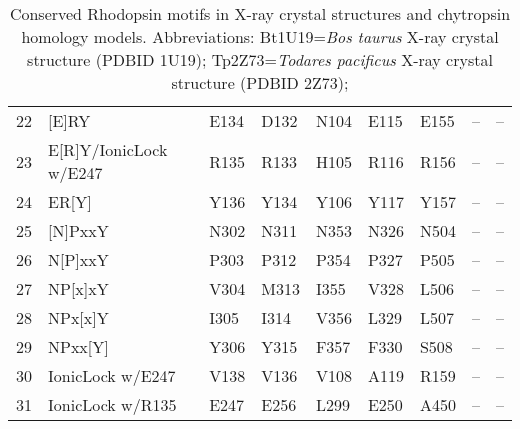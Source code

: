 \begin{table}[tbp]
\begin{tabular}{rllllllll}
   \hline
22 & [E]RY & E134 & D132 & N104 & E115 & E155 & -- & -- \\ 
  23 & E[R]Y/IonicLock w/E247 & R135 & R133 & H105 & R116 & R156 & -- & -- \\ 
  24 & ER[Y] & Y136 & Y134 & Y106 & Y117 & Y157 & -- & -- \\ 
   \hline
25 & [N]PxxY & N302 & N311 & N353 & N326 & N504 & -- & -- \\ 
  26 & N[P]xxY & P303 & P312 & P354 & P327 & P505 & -- & -- \\ 
  27 & NP[x]xY & V304 & M313 & I355 & V328 & L506 & -- & -- \\ 
  28 & NPx[x]Y & I305 & I314 & V356 & L329 & L507 & -- & -- \\ 
  29 & NPxx[Y] & Y306 & Y315 & F357 & F330 & S508 & -- & -- \\ 
   \hline
30 & IonicLock w/E247 & V138 & V136 & V108 & A119 & R159 & -- & -- \\ 
  31 & IonicLock w/R135 & E247 & E256 & L299 & E250 & A450 & -- & -- \\ 
   \hline
\hline
\end{tabular}
\caption[Locations of key residues in rhodopsin structural motifs]{Conserved Rhodopsin motifs in X-ray crystal structures and chytropsin homology models. Abbreviations: Bt1U19=\textit{Bos taurus} X-ray crystal structure (PDBID 1U19); Tp2Z73=\textit{Todares pacificus} X-ray crystal structure (PDBID 2Z73);} 
\label{tab:ChRhod_motifs}
\end{table}